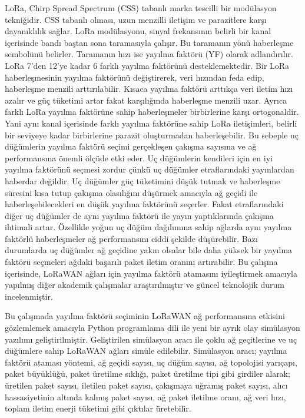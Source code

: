 LoRa, Chirp Spread Spectrum (CSS) tabanlı marka tescilli bir modülasyon tekniğidir. CSS tabanlı olması, uzun menzilli iletişim ve parazitlere karşı dayanıklılık sağlar. LoRa modülasyonu, sinyal frekansının belirli bir kanal içerisinde bandı baştan sona taramasıyla çalışır. Bu taramanın yönü haberleşme sembolünü belirler. Taramanın hızı ise yayılma faktörü (YF) olarak adlandırılır. LoRa 7'den 12'ye kadar 6 farklı yayılma faktörünü desteklemektedir. Bir LoRa haberleşmesinin yayılma faktörünü değiştirerek, veri hızından feda edip, haberleşme menzili arttırılabilir. Kısaca yayılma faktörü arttıkça veri iletim hızı azalır ve güç tüketimi artar fakat karşılığında haberleşme menzili uzar. Ayrıca farklı LoRa yayılma faktörüne sahip haberleşmeler birbirlerine karşı ortogonaldir. Yani aynı kanal içerisinde farklı yayılma faktörüne sahip LoRa iletişimleri, belirli bir seviyeye kadar birbirlerine parazit oluşturmadan haberleşebilir. Bu sebeple uç düğümlerin yayılma faktörü seçimi gerçekleşen çakışma sayısına ve ağ performansına önemli ölçüde etki eder. Uç düğümlerin kendileri için en iyi yayılma faktörünü seçmesi zordur çünkü uç düğümler etraflarındaki yayınlardan haberdar değildir. Uç düğümler güç tüketimini düşük tutmak ve haberleşme süresini kısa tutup çakışma olasılığını düşürmek amacıyla ağ geçidi ile haberleşebilecekleri en düşük yayılma faktörünü seçerler. Fakat etraflarındaki diğer uç düğümler de aynı yayılma faktörü ile yayın yaptıklarında çakışma ihtimali artar. Özellikle yoğun uç düğüm dağılımına sahip ağlarda aynı yayılma faktörlü haberleşmeler ağ performansını ciddi şekilde düşürebilir. Bazı durumlarda uç düğümler ağ geçidine yakın olsalar bile daha yüksek bir yayılma faktörü seçmeleri ağdaki başarılı paket iletim oranını artırabilir. Bu çalışma içerisinde, LoRaWAN ağları için yayılma faktörü atamasını iyileştirmek amacıyla yapılmış diğer akademik çalışmalar araştırılmıştır ve güncel teknolojik durum incelenmiştir.

Bu çalışmada yayılma faktörü seçiminin LoRaWAN ağ performansına etkisini gözlemlemek amacıyla Python programlama dili ile yeni bir ayrık olay simülasyon yazılımı geliştirilmiştir. Geliştirilen simülasyon aracı ile çoklu ağ geçitlerine ve uç düğümlere sahip LoRaWAN ağları simüle edilebilir. Simülasyon aracı; yayılma faktörü ataması yöntemi, ağ geçidi sayısı, uç düğüm sayısı, ağ topolojisi yarıçapı, paket büyüklüğü, paket üretilme sıklığı, paket üretilme tipi gibi girdiler alarak; üretilen paket sayısı, iletilen paket sayısı, çakışmaya uğramış paket sayısı, alıcı hassasiyetinin altında kalmış paket sayısı, ağ paket iletilme oranı, ağ veri hızı, toplam iletim enerji tüketimi gibi çıktılar üretebilir.


